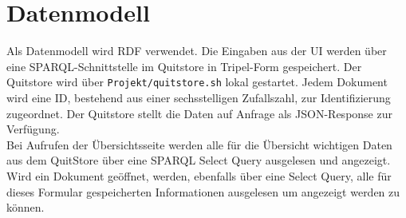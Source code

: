 \documentclass[a4paper,11pt,oneside, titlepage]{article}
\begin{document}
  \newpage

\section{Datenmodell}
Als Datenmodell wird \gls{RDF} verwendet. Die Eingaben aus der UI werden über eine \gls{SPARQL}-Schnittstelle im \gls{Quitstore} in Tripel-Form gespeichert.  Der Quitstore wird über \verb+Projekt/quitstore.sh+ lokal gestartet. Jedem Dokument wird eine ID, bestehend aus einer sechsstelligen Zufallszahl, zur Identifizierung zugeordnet. Der Quitstore stellt die Daten auf Anfrage als \gls{JSON}-Response zur Verfügung. \\ Bei Aufrufen der Übersichtsseite werden alle für die Übersicht wichtigen Daten aus dem QuitStore über eine SPARQL Select Query ausgelesen und angezeigt. Wird ein Dokument geöffnet, werden, ebenfalls über eine Select Query, alle für dieses Formular gespeicherten Informationen ausgelesen um angezeigt werden zu können.

\newpage
\printglossaries
\end{document}
